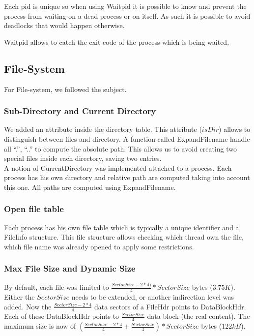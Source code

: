 Each pid is unique so when using Waitpid it is possible to know and prevent the
process from waiting on a dead process or on itself. As such it is possible
to avoid deadlocks that would happen otherwise.

Waitpid allows to catch the exit code of the process which is being waited.

\subsection{File-System}
For File-system, we followed the subject.

\subsubsection{Sub-Directory and Current Directory}

We added an attribute inside the directory table. This attribute ($isDir$) allows
to distinguish between files and directory. A function called
\textrm{ExpandFilename} handle all ``.'', ``..'' to compute the absolute
path. This allows us to avoid creating two special files inside each directory,
saving two entries.\\

A notion of CurrentDirectory was implemented attached to a process. Each process
has his own directory and relative path are computed taking into account this
one. All paths are computed using ExpandFilename.

\subsubsection{Open file table}
Each process has his own file table which is typically a unique identifier and a
FileInfo structure. This file structure allows checking which thread own the
file, which file name was already opened to apply some restrictions.

\subsubsection{Max File Size and Dynamic Size}
By default, each file was limited to $\frac{SectorSize - 2*4)}{4} * SectorSize$
bytes ($3.75K$). Either the $SectorSize$ needs to be extended, or another
indirection level was added.
Now the $\frac{SectorSize - 2*4}{4}$ data sectors of a FileHdr points to
DataBlockHdr. Each of these DataBlockHdr points to $\frac{SectorSize}{4}$ data
block (the real content).
The maximum size is now of $(\frac{SectorSize - 2*4}{4} +
\frac{SectorSize}{4})*SectorSize$ bytes ($122kB$).\\

